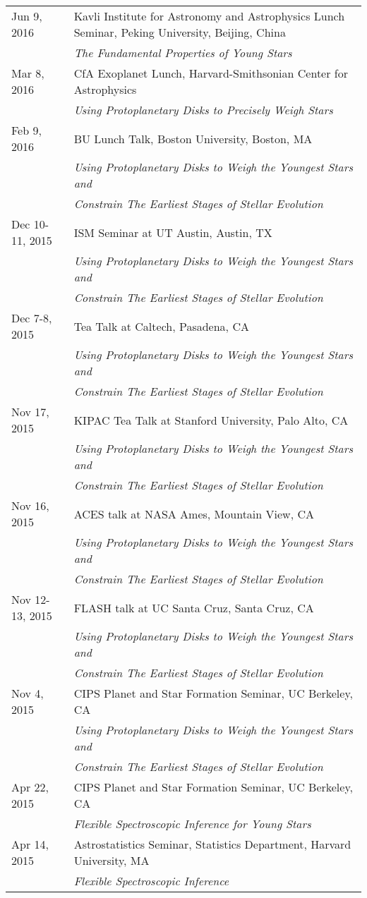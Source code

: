 \begin{longtable}{@{\hspace{10pt}}p{1.2in}l}
  Jun 9, 2016 & Kavli Institute for Astronomy and Astrophysics Lunch Seminar, Peking University, Beijing, China \\
  & \emph{The Fundamental Properties of Young Stars} \\[\rowskip]
  Mar 8, 2016 & CfA Exoplanet Lunch, Harvard-Smithsonian Center for Astrophysics \\
  & \emph{Using Protoplanetary Disks to Precisely Weigh Stars} \\[\rowskip]
  Feb 9, 2016 & BU Lunch Talk, Boston University, Boston, MA \\
  & \emph{Using Protoplanetary Disks to Weigh the Youngest Stars and} \\
  & \emph{Constrain The Earliest Stages of Stellar Evolution} \\[\rowskip]
  Dec 10-11, 2015 & ISM Seminar at UT Austin, Austin, TX \\
  & \emph{Using Protoplanetary Disks to Weigh the Youngest Stars and} \\
  & \emph{Constrain The Earliest Stages of Stellar Evolution} \\[\rowskip]
  Dec 7-8, 2015 & Tea Talk at Caltech, Pasadena, CA \\
  & \emph{Using Protoplanetary Disks to Weigh the Youngest Stars and} \\
  & \emph{Constrain The Earliest Stages of Stellar Evolution} \\[\rowskip]
  Nov 17, 2015 & KIPAC Tea Talk at Stanford University, Palo Alto, CA \\
  & \emph{Using Protoplanetary Disks to Weigh the Youngest Stars and} \\
  & \emph{Constrain The Earliest Stages of Stellar Evolution} \\[\rowskip]
  Nov 16, 2015 & ACES talk at NASA Ames, Mountain View, CA \\
  & \emph{Using Protoplanetary Disks to Weigh the Youngest Stars and} \\
  & \emph{Constrain The Earliest Stages of Stellar Evolution} \\[\rowskip]
  Nov 12-13, 2015 & FLASH talk at UC Santa Cruz, Santa Cruz, CA \\
  & \emph{Using Protoplanetary Disks to Weigh the Youngest Stars and} \\
  & \emph{Constrain The Earliest Stages of Stellar Evolution} \\[\rowskip]
  Nov 4, 2015 & CIPS Planet and Star Formation Seminar, UC Berkeley, CA\\
  & \emph{Using Protoplanetary Disks to Weigh the Youngest Stars and} \\
  & \emph{Constrain The Earliest Stages of Stellar Evolution} \\[\rowskip]
  Apr 22, 2015 & CIPS Planet and Star Formation Seminar, UC Berkeley, CA\\
  & \emph{Flexible Spectroscopic Inference for Young Stars} \\[\rowskip]
  Apr 14, 2015 & Astrostatistics Seminar, Statistics Department, Harvard University, MA \\
  & \emph{Flexible Spectroscopic Inference} \\[\rowskip]
\end{longtable}
